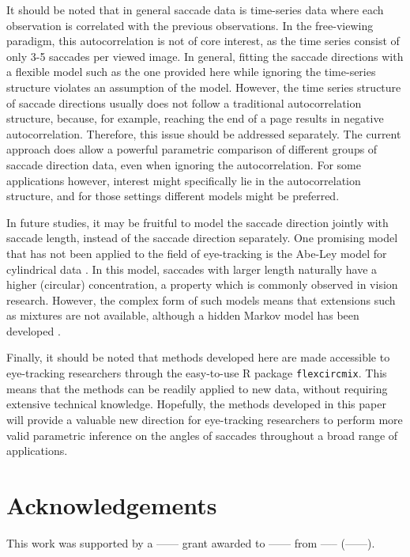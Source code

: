 It should be noted that in general saccade data is time-series data where each observation is correlated with the previous observations. In the free-viewing paradigm, this autocorrelation is not of core interest, as the time series consist of only 3-5 saccades per viewed image. In general, fitting the saccade directions with a flexible model such as the one provided here while ignoring the time-series structure violates an assumption of the model. However, the time series structure of saccade directions usually does not follow a traditional autocorrelation structure, because, for example, reaching the end of a page results in negative autocorrelation. Therefore, this issue should be addressed separately. The current approach does allow a powerful parametric comparison of different groups of saccade direction data, even when ignoring the autocorrelation. For some applications however, interest might specifically lie in the autocorrelation structure, and for those settings different models might be preferred.

In future studies, it may be fruitful to model the saccade direction jointly with saccade length, instead of the saccade direction separately. One promising model that has not been applied to the field of eye-tracking is the Abe-Ley model for cylindrical data \citep{abe2016tractable}. In this model, saccades with larger length naturally have a higher (circular) concentration, a property which is commonly observed in vision research. However, the complex form of such models means that extensions such as mixtures are not available, although a hidden Markov model has been developed \citep{lagona2015hidden}.

Finally, it should be noted that methods developed here are made accessible to eye-tracking researchers through the easy-to-use R package \texttt{flexcircmix}. This means that the methods can be readily applied to new data, without requiring extensive technical knowledge. Hopefully, the methods developed in this paper will provide a valuable new direction for eye-tracking researchers to perform more valid parametric inference on the angles of saccades throughout a broad range of applications.



\section{Acknowledgements}

This work was supported by a ------ grant awarded to ------ from ----- (------).




